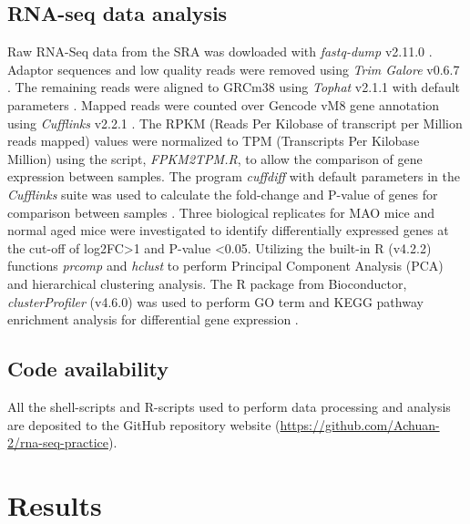 \documentclass[
  a4paper,
]{article}
\begin{document}
\hypertarget{rna-seq-data-analysis}{%
\subsection{RNA-seq data analysis}\label{rna-seq-data-analysis}}

Raw RNA-Seq data from the SRA was dowloaded with \emph{fastq-dump}
v2.11.0 \cite{2010sra}. Adaptor sequences and low quality reads were
removed using \emph{Trim Galore} v0.6.7
\cite{felix_krueger_2021_5127899}. The remaining reads were aligned to
GRCm38 using \emph{Tophat} v2.1.1 with default parameters
\cite{kimTopHat2AccurateAlignment2013}. Mapped reads were counted over
Gencode vM8 gene annotation using \emph{Cufflinks} v2.2.1
\cite{trapnellTranscriptAssemblyQuantification2010}. The RPKM (Reads Per
Kilobase of transcript per Million reads mapped) values were normalized
to TPM (Transcripts Per Kilobase Million) using the script,
\emph{FPKM2TPM.R}, to allow the comparison of gene expression between
samples. The program \emph{cuffdiff} with default parameters in the
\emph{Cufflinks} suite was used to calculate the fold-change and P-value
of genes for comparison between samples
\cite{trapnellTranscriptAssemblyQuantification2010}. Three biological
replicates for MAO mice and normal aged mice were investigated to
identify differentially expressed genes at the cut-off of
\textbar log2FC\textgreater1\textbar{} and P-value \textless0.05.
Utilizing the built-in R (v4.2.2) functions \emph{prcomp} and
\emph{hclust} to perform Principal Component Analysis (PCA) and
hierarchical clustering analysis. The R package from Bioconductor,
\emph{clusterProfiler} (v4.6.0) was used to perform GO term and KEGG
pathway enrichment analysis for differential gene expression
\cite{yuClusterProfilerPackageComparing2012}.

\hypertarget{code-availability}{%
\subsection{Code availability}\label{code-availability}}

All the shell-scripts and R-scripts used to perform data processing and
analysis are deposited to the GitHub repository website
(\url{https://github.com/Achuan-2/rna-seq-practice}).

\hypertarget{results}{%
\section{Results}\label{results}}
\end{document}
